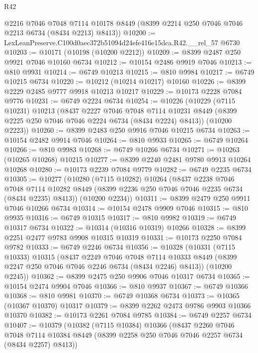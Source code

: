 \begin{lexlean}{R42}
\begin{coremodule}
{      @2216
      @7046
      @7048
      @7114
      @10178
      @8449
      (@8399 @2214 @250 @7046 @7046 @2213 @6734 (@8434 @2213) @8413))
@10200 := LexLeanPreserve.C100d0aec372b51094d24efe416e15dca.R42.__rel_57 @6730
@10203 := @10171 (@10198 (@10200 @2212))
@10209 := @8399 @2487 @250 @9921 @7046 @10160 @6734
@10212 := @10154 @2486 @9919 @7046
@10213 := @810 @9931
@10214 := @6749 @10213
@10215 := @810 @9984
@10217 := @6749 @10215 @6734
@10220 := @10212 (@10214 @10217) @10160
@10226 := @8399 @2229 @2485 @9777 @9918 @10213 @10217
@10229 := @10173 @2228 @7084 @9776
@10231 := @6749 @2224 @6734
@10254 := @10226
    (@10229
      (@7115 @10231)
      @10213
      (@8437
        @2227
        @7046
        @7048
        @7114
        @10231
        @8449
        (@8399 @2225 @250 @7046 @7046 @2224 @6734 (@8434 @2224) @8413))
      (@10200 @2223))
@10260 := @8399 @2483 @250 @9916 @7046 @10215 @6734
@10263 := @10154 @2482 @9914 @7046
@10264 := @810 @9933
@10265 := @6749 @10264
@10266 := @810 @9983
@10268 := @6749 @10266 @6734
@10271 := @10263 (@10265 @10268) @10215
@10277 := @8399 @2240 @2481 @9780 @9913 @10264 @10268
@10280 := @10173 @2239 @7084 @9779
@10282 := @6749 @2235 @6734
@10305 := @10277
    (@10280
      (@7115 @10282)
      @10264
      (@8437
        @2238
        @7046
        @7048
        @7114
        @10282
        @8449
        (@8399 @2236 @250 @7046 @7046 @2235 @6734 (@8434 @2235) @8413))
      (@10200 @2234))
@10311 := @8399 @2479 @250 @9911 @7046 @10266 @6734
@10314 := @10154 @2478 @9909 @7046
@10315 := @810 @9935
@10316 := @6749 @10315
@10317 := @810 @9982
@10319 := @6749 @10317 @6734
@10322 := @10314 (@10316 @10319) @10266
@10328 := @8399 @2251 @2477 @9783 @9908 @10315 @10319
@10331 := @10173 @2250 @7084 @9782
@10333 := @6749 @2246 @6734
@10356 := @10328
    (@10331
      (@7115 @10333)
      @10315
      (@8437
        @2249
        @7046
        @7048
        @7114
        @10333
        @8449
        (@8399 @2247 @250 @7046 @7046 @2246 @6734 (@8434 @2246) @8413))
      (@10200 @2245))
@10362 := @8399 @2475 @250 @9906 @7046 @10317 @6734
@10365 := @10154 @2474 @9904 @7046
@10366 := @810 @9937
@10367 := @6749 @10366
@10368 := @810 @9981
@10370 := @6749 @10368 @6734
@10373 := @10365 (@10367 @10370) @10317
@10379 := @8399 @2262 @2473 @9786 @9903 @10366 @10370
@10382 := @10173 @2261 @7084 @9785
@10384 := @6749 @2257 @6734
@10407 := @10379
    (@10382
      (@7115 @10384)
      @10366
      (@8437
        @2260
        @7046
        @7048
        @7114
        @10384
        @8449
        (@8399 @2258 @250 @7046 @7046 @2257 @6734 (@8434 @2257) @8413))
}
\end{coremodule}
\end{lexlean}
